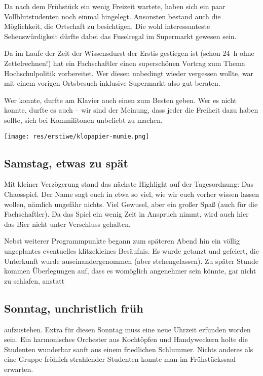 \begin{multicols*}{2}
Da nach dem Frühstück ein wenig Freizeit wartete, haben sich ein paar Vollblutstudenten noch einmal hingelegt.
Ansonsten bestand auch die Möglichkeit, die Ortschaft zu besichtigen.
Die wohl interessanteste Sehenswürdigkeit dürfte dabei das Fuselregal im Supermarkt gewesen sein.

Da im Laufe der Zeit der Wissensdurst der Erstis gestiegen ist (schon \SI{24}{\hour} ohne Zettelrechnen!) hat ein Fachschaftler einen superschönen Vortrag zum Thema Hochschulpolitik vorbereitet.
Wer diesen unbedingt wieder vergessen wollte, war mit einem vorigen Ortsbesuch inklusive Supermarkt also gut beraten.

\newpage

Wer konnte, durfte am Klavier auch einen zum Besten geben.
Wer es nicht konnte, durfte es auch -- wir sind der Meinung, dass jeder die Freiheit dazu haben sollte, sich bei Kommilitonen unbeliebt zu machen.

\begin{center}
	\texttt{[image: res/erstiwe/klopapier-mumie.png]}
\end{center}

\subsection{Samstag, etwas zu spät}
Mit kleiner Verzögerung stand das nächste Highlight auf der Tagesordnung:
Das Chaosspiel.
Der Name sagt euch in etwa so viel, wie wir euch vorher wissen lassen wollen, nämlich ungefähr nichts.
Viel Gewusel, aber ein großer Spaß (auch für die Fachschaftler).
Da das Spiel ein wenig Zeit in Anspruch nimmt, wird auch hier das Bier nicht unter Verschluss gehalten.

Nebst weiterer Programmpunkte begann zum späteren Abend hin ein völlig ungeplantes eventuelles klitzekleines Besäufnis.
Es wurde getanzt und gefeiert, die Unterkunft wurde auseinandergenommen (aber stehengelassen).
Zu später Stunde kommen Überlegungen auf, dass es womöglich angenehmer sein könnte, gar nicht zu schlafen, anstatt 

\subsection{Sonntag, unchristlich früh}
aufzustehen.
Extra für diesen Sonntag muss eine neue Uhrzeit erfunden worden sein.
Ein harmonisches Orchester aus Kochtöpfen und Handyweckern holte die Studenten wunderbar sanft aus einem friedlichen Schlummer.
Nichts anderes als eine Gruppe fröhlich strahlender Studenten konnte man im Frühstückssaal erwarten.


\end{multicols*}
